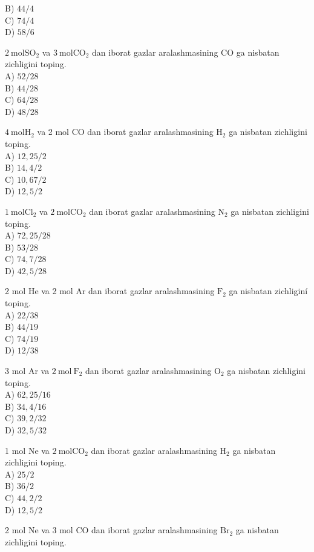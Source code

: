 B) $44 / 4$\\
C) $74 / 4$\\
D) $58 / 6$
  \item $2 \mathrm{~mol} \mathrm{SO}_{2}$ va $3 \mathrm{~mol} \mathrm{CO}_{2}$ dan iborat gazlar aralashmasining CO ga nisbatan zichligini toping.\\
A) $52 / 28$\\
B) $44 / 28$\\
C) $64 / 28$\\
D) $48 / 28$
  \item $4 \mathrm{~mol} \mathrm{H}_{2}$ va 2 mol CO dan iborat gazlar aralashmasining $\mathrm{H}_{2}$ ga nisbatan zichligini toping.\\
A) $12,25 / 2$\\
B) $14,4 / 2$\\
C) $10,67 / 2$\\
D) $12,5 / 2$
  \item $1 \mathrm{~mol} \mathrm{Cl}_{2}$ va $2 \mathrm{~mol} \mathrm{CO}_{2}$ dan iborat gazlar aralashmasining $\mathrm{N}_{2}$ ga nisbatan zichligini toping.\\
A) $72,25 / 28$\\
B) $53 / 28$\\
C) $74,7 / 28$\\
D) $42,5 / 28$
  \item 2 mol He va 2 mol Ar dan iborat gazlar aralashmasining $\mathrm{F}_{2}$ ga nisbatan zichliginí toping.\\
A) $22 / 38$\\
B) $44 / 19$\\
C) $74 / 19$\\
D) $12 / 38$
  \item 3 mol Ar va $2 \mathrm{~mol} \mathrm{~F}_{2}$ dan iborat gazlar aralashmasining $\mathrm{O}_{2}$ ga nisbatan zichligini toping.\\
A) $62,25 / 16$\\
B) $34,4 / 16$\\
C) $39,2 / 32$\\
D) $32,5 / 32$
  \item 1 mol Ne va $2 \mathrm{~mol} \mathrm{CO}_{2}$ dan iborat gazlar aralashmasining $\mathrm{H}_{2}$ ga nisbatan zichligini toping.\\
A) $25 / 2$\\
B) $36 / 2$\\
C) $44,2 / 2$\\
D) $12,5 / 2$
  \item 2 mol Ne va 3 mol CO dan iborat gazlar aralashmasining $\mathrm{Br}_{2}$ ga nisbatan zichligini toping.\\
